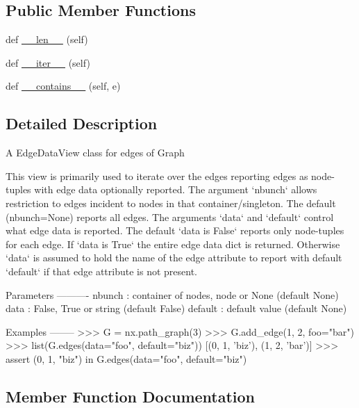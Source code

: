 \subsection*{Public Member Functions}
\begin{DoxyCompactItemize}
\item 
def \hyperlink{classnetworkx_1_1classes_1_1reportviews_1_1EdgeDataView_a53025b7e4d937edc47955818b5e5b87c}{\+\_\+\+\_\+len\+\_\+\+\_\+} (self)
\item 
def \hyperlink{classnetworkx_1_1classes_1_1reportviews_1_1EdgeDataView_aa2452de3b4d608d3f183b5552e073007}{\+\_\+\+\_\+iter\+\_\+\+\_\+} (self)
\item 
def \hyperlink{classnetworkx_1_1classes_1_1reportviews_1_1EdgeDataView_af6acbe5799fe5fa1c9180fba65c05514}{\+\_\+\+\_\+contains\+\_\+\+\_\+} (self, e)
\end{DoxyCompactItemize}


\subsection{Detailed Description}
\begin{DoxyVerb}A EdgeDataView class for edges of Graph

This view is primarily used to iterate over the edges reporting
edges as node-tuples with edge data optionally reported. The
argument `nbunch` allows restriction to edges incident to nodes
in that container/singleton. The default (nbunch=None)
reports all edges. The arguments `data` and `default` control
what edge data is reported. The default `data is False` reports
only node-tuples for each edge. If `data is True` the entire edge
data dict is returned. Otherwise `data` is assumed to hold the name
of the edge attribute to report with default `default` if  that
edge attribute is not present.

Parameters
----------
nbunch : container of nodes, node or None (default None)
data : False, True or string (default False)
default : default value (default None)

Examples
--------
>>> G = nx.path_graph(3)
>>> G.add_edge(1, 2, foo="bar")
>>> list(G.edges(data="foo", default="biz"))
[(0, 1, 'biz'), (1, 2, 'bar')]
>>> assert (0, 1, "biz") in G.edges(data="foo", default="biz")
\end{DoxyVerb}
 

\subsection{Member Function Documentation}
\mbox{\label{classnetworkx_1_1classes_1_1reportviews_1_1EdgeDataView_af6acbe5799fe5fa1c9180fba65c05514}} 
